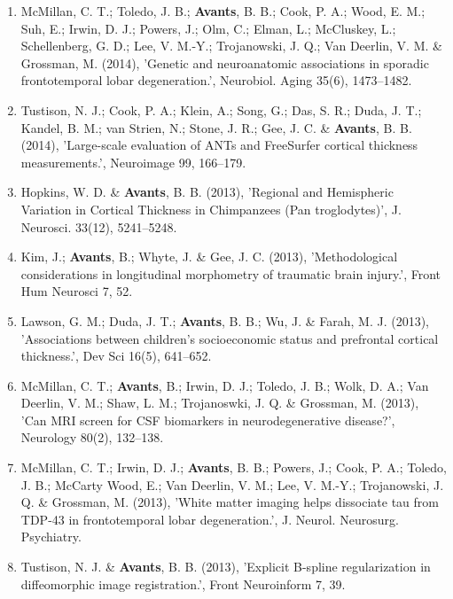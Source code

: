 \documentclass[11pt]{moderncv} %
\begin{document}
\begin{enumerate}
\item  McMillan, C. T.; Toledo, J. B.; \textbf{Avants}, B. B.; Cook, P. A.; Wood, E. M.; Suh, E.; Irwin, D. J.; Powers, J.; Olm, C.; Elman, L.; McCluskey, L.; Schellenberg, G. D.; Lee, V. M.-Y.; Trojanowski, J. Q.; Van Deerlin, V. M. \&  Grossman, M. (2014), 'Genetic and neuroanatomic associations in sporadic frontotemporal lobar degeneration.', Neurobiol. Aging 35(6), 1473--1482.

\item  Tustison, N. J.; Cook, P. A.; Klein, A.; Song, G.; Das, S. R.; Duda, J. T.; Kandel, B. M.; van Strien, N.; Stone, J. R.; Gee, J. C. \&  \textbf{Avants}, B. B. (2014), 'Large-scale evaluation of ANTs and FreeSurfer cortical thickness measurements.', Neuroimage 99, 166--179.

\item  Hopkins, W. D. \&  \textbf{Avants}, B. B. (2013), 'Regional and Hemispheric Variation in Cortical Thickness in Chimpanzees (Pan troglodytes)', J. Neurosci. 33(12), 5241--5248.

\item  Kim, J.; \textbf{Avants}, B.; Whyte, J. \&  Gee, J. C. (2013), 'Methodological considerations in longitudinal morphometry of traumatic brain injury.', Front Hum Neurosci 7, 52.

\item  Lawson, G. M.; Duda, J. T.; \textbf{Avants}, B. B.; Wu, J. \&  Farah, M. J. (2013), 'Associations between children's socioeconomic status and prefrontal cortical thickness.', Dev Sci 16(5), 641--652.

\item  McMillan, C. T.; \textbf{Avants}, B.; Irwin, D. J.; Toledo, J. B.; Wolk, D. A.; Van Deerlin, V. M.; Shaw, L. M.; Trojanoswki, J. Q. \&  Grossman, M. (2013), 'Can MRI screen for CSF biomarkers in neurodegenerative disease?', Neurology 80(2), 132--138.

\item  McMillan, C. T.; Irwin, D. J.; \textbf{Avants}, B. B.; Powers, J.; Cook, P. A.; Toledo, J. B.; McCarty Wood, E.; Van Deerlin, V. M.; Lee, V. M.-Y.; Trojanowski, J. Q. \&  Grossman, M. (2013), 'White matter imaging helps dissociate tau from TDP-43 in frontotemporal lobar degeneration.', J. Neurol. Neurosurg. Psychiatry.

\item  Tustison, N. J. \&  \textbf{Avants}, B. B. (2013), 'Explicit B-spline regularization in diffeomorphic image registration.', Front Neuroinform 7, 39.


\end{enumerate}
\end{document}
